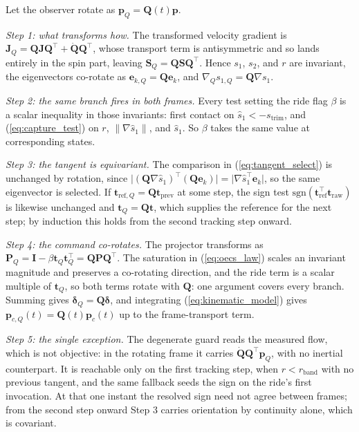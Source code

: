 \documentclass[lettersize,journal]{IEEEtran}
\begin{document}
\begin{IEEEproof}
Let the observer rotate as $\mathbf{p}_Q = \mathbf{Q}(t)\mathbf{p}$.

\textit{Step 1: what transforms how.} The transformed velocity gradient
is $\mathbf{J}_Q = \mathbf{Q}\mathbf{J}\mathbf{Q}^\top +
\dot{\mathbf{Q}}\mathbf{Q}^\top$, whose transport term is antisymmetric
and so lands entirely in the spin part, leaving $\mathbf{S}_Q =
\mathbf{Q}\mathbf{S}\mathbf{Q}^\top$. Hence $s_1$, $s_2$, and $r$ are
invariant, the eigenvectors co-rotate as $\mathbf{e}_{k,Q} =
\mathbf{Q}\mathbf{e}_k$, and $\nabla_Q s_{1,Q} = \mathbf{Q}\nabla s_1$.

\textit{Step 2: the same branch fires in both frames.} Every test setting
the ride flag $\beta$ is a scalar inequality in those invariants: first
contact on $\hat{s}_1 < -s_{\mathrm{trim}}$, and (\ref{eq:capture_test}) on
$r$, $\lVert\nabla\hat{s}_1\rVert$, and $\hat{s}_1$. So $\beta$ takes the
same value at corresponding states.

\textit{Step 3: the tangent is equivariant.} The comparison in
(\ref{eq:tangent_select}) is unchanged by rotation, since
$\lvert(\mathbf{Q}\nabla\hat{s}_1)^\top(\mathbf{Q}\mathbf{e}_k)\rvert =
\lvert\nabla\hat{s}_1^\top\mathbf{e}_k\rvert$, so the same eigenvector is
selected. If $\mathbf{t}_{\mathrm{ref},Q} =
\mathbf{Q}\mathbf{t}_{\mathrm{prev}}$ at some step, the sign test
$\mathrm{sgn}(\mathbf{t}_{\mathrm{ref}}^\top\mathbf{t}_{\mathrm{raw}})$
is likewise unchanged and $\mathbf{t}_Q = \mathbf{Q}\mathbf{t}$, which
supplies the reference for the next step; by induction this holds from
the second tracking step onward.

\textit{Step 4: the command co-rotates.} The projector transforms as
$\mathbf{P}_Q = \mathbf{I} - \beta\mathbf{t}_Q\mathbf{t}_Q^\top =
\mathbf{Q}\mathbf{P}\mathbf{Q}^\top$. The saturation in
(\ref{eq:oecs_law}) scales an invariant magnitude and preserves a
co-rotating direction, and the ride term is a scalar multiple of
$\mathbf{t}_Q$, so both terms rotate with $\mathbf{Q}$: one argument
covers every branch. Summing gives $\boldsymbol{\delta}_Q =
\mathbf{Q}\boldsymbol{\delta}$, and integrating
(\ref{eq:kinematic_model}) gives $\mathbf{p}_{c,Q}(t) =
\mathbf{Q}(t)\mathbf{p}_c(t)$ up to the frame-transport term.

\textit{Step 5: the single exception.} The degenerate guard reads the
measured flow, which is not
objective: in the rotating frame it carries
$\dot{\mathbf{Q}}\mathbf{Q}^\top\mathbf{p}_Q$, with no inertial
counterpart. It is reachable only on the first tracking step, when $r <
r_{\mathrm{band}}$ with no previous tangent, and the same fallback seeds
the sign on the ride's first invocation. At that one instant the resolved
sign need not agree between frames; from the second step onward Step 3
carries orientation by continuity alone, which is covariant.
\end{IEEEproof}
\end{document}
